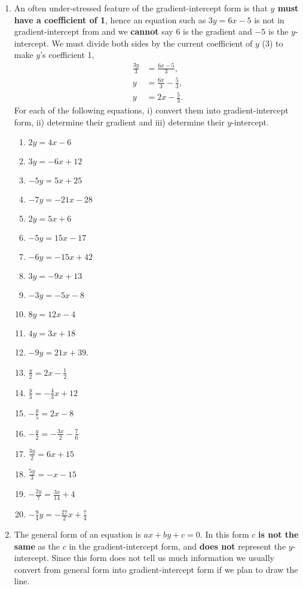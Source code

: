 \documentclass[a4paper,12pt]{article}
\begin{document}
\begin{enumerate}
\item An often under-stressed feature of the gradient-intercept
form is that \textbf{$y$ must have a coefficient of 1}, hence an equation
such as $3y = 6x - 5$ is not in gradient-intercept from and we 
\textbf{cannot} say $6$ is the gradient and $-5$ is the $y$-intercept.
We must divide both sides by the current coefficient of $y$ (3)
to make $y$'s coefficient 1,
\begin{align*}
    \frac{3y}{3} &= \frac{6x - 5}{3}, \\
    y &= \frac{6x}{3} - \frac{5}{3}, \\
    y &= 2x - \frac{5}{3}.
\end{align*}
For each of the following equations, i) convert them into 
gradient-intercept form, ii) determine their gradient and 
iii) determine their $y$-intercept.
    \begin{multicols}{2}
    \begin{enumerate}
    \item $2y = 4x - 6$
    \item $3y = -6x + 12$
    \item $-5y = 5x + 25$
    \item $-7y = -21x - 28$
    \item $2y = 5x + 6$
    \item $-5y = 15x - 17$
    \item $-6y = -15x + 42$
    \item $3y = -9x + 13$
    \item $-3y = -5x - 8$
    \item $8y = 12x - 4$
    \item $4y = 3x + 18$
    \item $-9y = 21x + 39$.
    \item $\frac{y}{2} = 2x - \frac{1}{2}$
    \item $\frac{y}{3} = -\frac{4}{3}x + 12$
    \item $-\frac{y}{5} = 2x - 8$
    \item $-\frac{y}{2} = -\frac{3x}{2} - \frac{7}{6}$
    \item $\frac{3y}{2} = 6x + 15$
    \item $\frac{5y}{3} = -x - 15$
    \item $-\frac{2y}{7} = \frac{3x}{14} + 4$
    \item $-\frac{9}{4}y = -\frac{27}{2}x + \frac{7}{4}$
    \end{enumerate}
    \end{multicols}

\item The general form of an equation is $ax + by + c = 0$.
In this form $c$ \textbf{is not the same} as the $c$ in the 
gradient-intercept form, and \textbf{does not} represent the
$y$-intercept. Since this form does not tell us much information
we usually convert from general form into gradient-intercept 
form if we plan to draw the line.
\end{enumerate}
\end{document}
